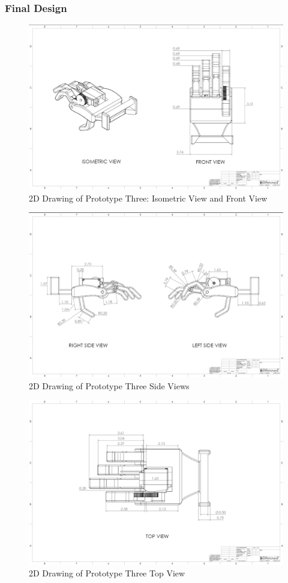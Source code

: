 \documentclass[11.5pt]{article}
\begin{document}
\newpage

\subsubsection{Final Design}

\begin{figure}[H]
    \centering
    \includegraphics[width=0.75\columnwidth]{2d/3DModelsPics/Screenshot (23).png}
    \caption{2D Drawing of Prototype Three: Isometric View and Front View}
    \label{RLDiagram}
\end{figure}
\begin{figure}[H]
    \centering
    \includegraphics[width=0.75\columnwidth]{2d/3DModelsPics/Screenshot (24).png}
    \caption{2D Drawing of Prototype Three Side Views}
    \label{RLDiagram}
\end{figure}
\begin{figure}[H]
    \centering
    \includegraphics[width=0.75\columnwidth]{2d/3DModelsPics/Screenshot (25).png}
    \caption{2D Drawing of Prototype Three Top View}
    \label{RLDiagram}
\end{figure}


\newpage

\pagebreak
\end{document}
